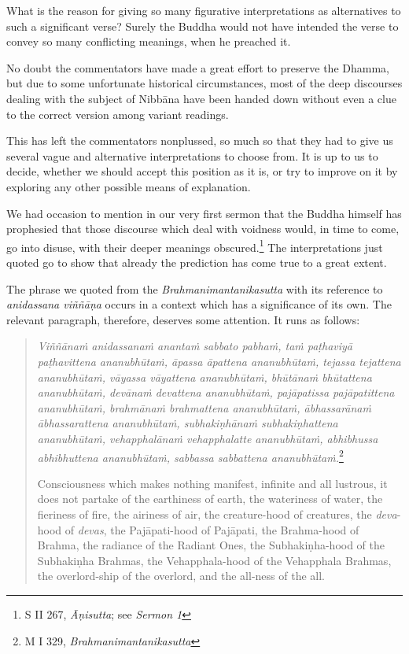 What is the reason for giving so many figurative interpretations as alternatives to such a significant verse? Surely the Buddha would not have intended the verse to convey so many conflicting meanings, when he preached it.

No doubt the commentators have made a great effort to preserve the Dhamma, but due to some unfortunate historical circumstances, most of the deep discourses dealing with the subject of Nibbāna have been handed down without even a clue to the correct version among variant readings.

This has left the commentators nonplussed, so much so that they had to give us several vague and alternative interpretations to choose from. It is up to us to decide, whether we should accept this position as it is, or try to improve on it by exploring any other possible means of explanation.

We had occasion to mention in our very first sermon that the Buddha himself has prophesied that those discourse which deal with voidness would, in time to come, go into disuse, with their deeper meanings obscured.\footnote{S II 267, \emph{Āṇisutta}; see \emph{Sermon 1}} The interpretations just quoted go to show that already the prediction has come true to a great extent.

The phrase we quoted from the \emph{Brahmanimantanikasutta} with its reference to \emph{anidassana viññāṇa} occurs in a context which has a significance of its own. The relevant paragraph, therefore, deserves some attention. It runs as follows:

\begin{quote}
\emph{Viññānaṁ anidassanaṁ anantaṁ sabbato pabhaṁ, taṁ paṭhaviyā paṭhavittena ananubhūtaṁ, āpassa āpattena ananubhūtaṁ, tejassa tejattena ananubhūtaṁ, vāyassa vāyattena ananubhūtaṁ, bhūtānaṁ bhūtattena ananubhūtaṁ, devānaṁ devattena ananubhūtaṁ, pajāpatissa pajāpatittena ananubhūtaṁ, brahmānaṁ brahmattena ananubhūtaṁ, ābhassarānaṁ ābhassarattena ananubhūtaṁ, subhakiṇhānaṁ subhakiṇhattena ananubhūtaṁ, vehapphalānaṁ vehapphalatte ananubhūtaṁ, abhibhussa abhibhuttena ananubhūtaṁ, sabbassa sabbattena ananubhūtaṁ.}\footnote{M I 329, \emph{Brahmanimantanikasutta}}

Consciousness which makes nothing manifest, infinite and all lustrous, it does not partake of the earthiness of earth, the wateriness of water, the fieriness of fire, the airiness of air, the creature-hood of creatures, the \emph{deva}-hood of \emph{devas}, the Pajāpati-hood of Pajāpati, the Brahma-hood of Brahma, the radiance of the Radiant Ones, the Subhakiṇha-hood of the Subhakiṇha Brahmas, the Vehapphala-hood of the Vehapphala Brahmas, the overlord-ship of the overlord, and the all-ness of the all.
\end{quote}

